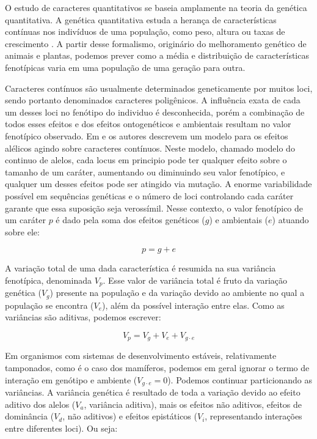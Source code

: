 O estudo de caracteres quantitativos se baseia amplamente na teoria da
genética quantitativa.
A genética quantitativa estuda a herança de características contínuas
nos indivíduos de uma população, como peso, altura ou taxas de
crescimento \citep{Falconer1996}.
A partir desse formalismo, originário do melhoramento genético de animais e plantas, 
podemos prever como a média e distribuição de
características fenotípicas varia em uma população de uma geração para
outra.

Caracteres contínuos são usualmente determinados geneticamente por muitos loci,
sendo portanto denominados caracteres poligênicos.
A influência exata de cada um desses loci no fenótipo do individuo é
desconhecida, porém a combinação de todos esses efeitos e dos efeitos
ontogenéticos e ambientais resultam no valor fenotípico observado.
Em \cite{Crow1964} e \cite{Kimura1965} os autores descrevem um modelo
para os efeitos alélicos agindo sobre caracteres contínuos.
Neste modelo, chamado modelo do continuo de alelos, cada locus em
principio pode ter qualquer efeito sobre o tamanho de um caráter,
aumentando ou diminuindo seu valor fenotípico, e
qualquer um desses efeitos pode ser atingido via mutação.
A enorme variabilidade possível em sequências genéticas e o número de
loci controlando cada caráter garante que essa suposição seja verossímil.
Nesse contexto, o valor fenotípico de um caráter $p$ é dado pela soma dos
efeitos genéticos ($g$) e ambientais ($e$) atuando sobre ele:

\begin{equation}
    p = g + e
\end{equation}

A variação total de uma dada característica é resumida na sua variância
fenotípica, denominada $V_p$.
Esse valor de variância total é fruto da variação genética ($V_g$)
presente na população e da variação devido ao ambiente no qual a
população se encontra ($V_e$), além da possível interação entre elas.
Como as variâncias são aditivas, podemos escrever:

\begin{equation}
    V_p = V_g + V_e + V_{g \cdot e}
\end{equation}

Em organismos com sistemas de desenvolvimento estáveis, relativamente tamponados,
como é o caso dos mamíferos, podemos em geral ignorar o termo de interação em
genótipo e ambiente ($V_{g \cdot e} = 0$).
Podemos continuar particionando as variâncias.
A variância genética é resultado de toda a variação devido ao efeito
aditivo dos alelos ($V_a$, variância aditiva), mais os efeitos não
aditivos, efeitos de dominância ($V_d$, não aditivos) e efeitos
epistáticos ($V_{i}$, representando interações entre diferentes loci).
Ou seja:

